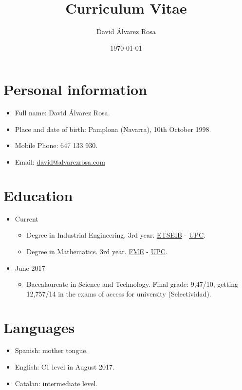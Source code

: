 \documentclass{article}
\title{Curriculum Vitae}
\author{David Álvarez Rosa}
\date{\today}
\begin{document}
\pagecolor{gray!6}
\pagestyle{empty}
\maketitle
\thispagestyle{empty}


\section*{Personal information}

\begin{itemize}
  \item Full name: David Álvarez Rosa.
  \item Place and date of birth: Pamplona (Navarra), 10th October 1998.
  \item Mobile Phone: 647 133 930.
  \item Email: \href{mailto:david@alvarezrosa.com}{david@alvarezrosa.com}
\end{itemize}


\section*{Education}

\begin{itemize}
  \item Current
  \begin{itemize}
    \item Degree in Industrial Engineering. 3rd year.
    \href{https://etseib.upc.edu}{ETSEIB} - \href{https://upc.edu}{UPC}.
    \item Degree in Mathematics. 3rd year. \href{https://fme.upc.edu}{FME} -
    \href{https://upc.edu}{UPC}.
  \end{itemize}
  \item June 2017
  \begin{itemize}
    \item Baccalaureate in Science and Technology. Final grade: 9,47/10, getting
    12,757/14 in the exams of access for university (Selectividad).
  \end{itemize}
\end{itemize}


\section*{Languages}

\begin{itemize}
  \item Spanish: mother tongue.
  \item English: C1 level in August 2017.
  \item Catalan: intermediate level.
\end{itemize}
\end{document}
